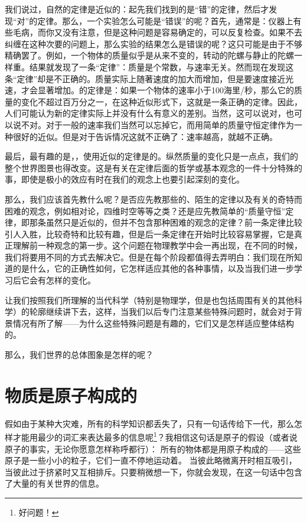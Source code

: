 \documentclass[11pt,oneside]{book}
\begin{document}
\begin{common-format}
我们说过，自然的定律是近似的：起先我们找到的是“错”的定律，然后才发现“对”的定律。那么，一个实验怎么可能是“错误”的呢？首先，通常是：仪器上有些毛病，而你又没有注意，但是这种问题是容易确定的，可以反复检查。如果不去纠缠在这种次要的问题上，那么实验的结果怎么是错误的呢？这只可能是由于不够精确罢了。例如，一个物体的质量似乎是从来不变的，转动的陀螺与静止的陀螺一样重。结果就发现了一条“定律”：质量是个常数，与速率无关。然而现在发现这条“定律”却是不正确的。质量实际上随著速度的加大而增加，但是要速度接近光速，才会显著增加。的定律是：如果一个物体的速率小于100海里/秒，那么它的质量的变化不超过百万分之一，在这种近似形式下，这就是一条正确的定律。因此，人们可能认为新的定律实际上并没有什么有意义的差别。当然，这可以说对，也可以说不对。对于一般的速率我们当然可以忘掉它，而用简单的质量守恒定律作为一种很好的近似。但是对于告诉情况这就不正确了：速率越高，就越不正确。

最后，最有趣的是，，使用近似的定律是的。纵然质量的变化只是一点点，我们的整个世界图景也得改变。这是有关在定律后面的哲学或基本观念的一件十分特殊的事，即使是极小的效应有时在我们的观念上也要引起深刻的变化。

那么，我们应该首先教什么呢？是否应先教那些的、陌生的定律以及有关的奇特而困难的观念，例如相对论，四维时空等等之类？还是应先教简单的“质量守恒”定律，即那条虽然只是近似的，但并不包含那种困难的观念的定律？前一条定律比较引人入胜，比较奇特和比较有趣，但是后一条定律在开始时比较容易掌握，它是真正理解前一种观念的第一步。这个问题在物理教学中会一再出现，在不同的时候，我们将要用不同的方式去解决它。但是在每个阶段都值得去弄明白：我们现在所知道的是什么，它的正确性如何，它怎样适应其他的各种事情，以及当我们进一步学习后它会有怎样的变化。

让我们按照我们所理解的当代科学（特别是物理学，但是也包括周围有关的其他科学）的轮廓继续讲下去，这样，当我们以后专门注意某些特殊问题时，就会对于背景情况有所了解——为什么这些特殊问题是有趣的，它们又是怎样适应整体结构的。

那么，我们世界的总体图象是怎样的呢？


\section{物质是原子构成的}
假如由于某种大灾难，所有的科学知识都丢失了，只有一句话传给下一代，那么怎样才能用最少的词汇来表达最多的信息呢\footnote{好问题！}？我相信这句话是原子的假设（或者说原子的事实，无论你愿意怎样称呼都行）： 所有的物体都是用原子构成的——这些原子是一些小小的粒子，它们一直不停地运动着。 当彼此略微离开时相互吸引， 当彼此过于挤紧时又互相排斥。只要稍微想一下，你就会发现，在这一句话中包含了大量的有关世界的信息。


\end{common-format}
\end{document}
